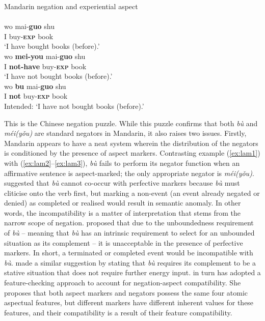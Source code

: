 \documentclass[output=paper,colorlinks,citecolor=brown,chinesefont]{langscibook}
\begin{document}
\ea Mandarin negation and experiential aspect \label{ex:lam3}\\
   \label{ex:lam3a}\\
    \gll wo	mai-\textbf{guo} shu\\
	I buy-\textbf{\textsc{exp}} book\\
	\glt `I have bought books (before).'
   \label{ex:lam3b}\\
    \gll wo	\textbf{mei-you} mai-\textbf{guo} shu\\
	I \textbf{not-have} buy-\textbf{\textsc{exp}} book\\
	\glt `I have not bought books (before).'
   \label{ex:lam3c}\\
  \gll *wo \textbf{bu} mai-\textbf{guo} shu \\
  	I \textbf{not} buy-\textbf{\textsc{exp}} book\\
  	\glt Intended: `I have not bought books (before).'
\z \z

This is the Chinese negation puzzle. While this puzzle confirms that both \textit{bù} and \textit{méi(yǒu)} are standard negators in Mandarin, it also raises two issues. Firstly, Mandarin appears to have a neat system wherein the distribution of the negators is conditioned by the presence of aspect markers. Contrasting example (\ref{ex:lam1}) with (\ref{ex:lam2}--\ref{ex:lam3}), \textit{bù} fails to perform its negator function when an affirmative sentence is aspect-marked; the only appropriate negator is \textit{méi(yǒu)}. \cite{Huang1988} suggested that \textit{bù} cannot co-occur with perfective markers because \textit{bù} must cliticise onto the verb first, but marking a non-event (an event already negated or denied) as completed or realised would result in semantic anomaly. In other words, the incompatibility is a matter of interpretation that stems from the narrow scope of negation. \cite{Ernst1995} proposed that due to the unboundedness requirement of \textit{bù} – meaning that \textit{bù} has an intrinsic requirement to select for an unbounded situation as its complement – it is unacceptable in the presence of perfective markers. In short, a terminated or completed event would be incompatible with \textit{bù}. \cite{Lin2003} made a similar suggestion by stating that \textit{bù} requires its complement to be a stative situation that does not require further energy input. \cite{Li2007} in turn has adopted a feature-checking approach to account for negation-aspect compatibility. She proposes that both aspect markers and negators possess the same four atomic aspectual features, but different markers have different inherent values for these features, and their compatibility is a result of their feature compatibility. 
\end{document}
